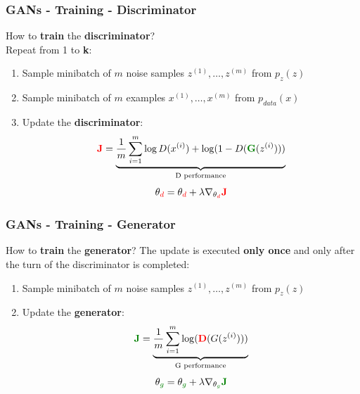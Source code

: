 \documentclass{beamer}
\begin{document}
\begin{frame}
\frametitle{GANs - Training - Discriminator}
How to \textbf{train} the \textbf{discriminator}? \\
Repeat from 1 to \textbf{k}:
\begin{enumerate}
\item<1-> \alert<+>{Sample minibatch of $m$ noise samples ${z^{(1)},\dots,z^{(m)}}$ from $p_z(z)$}
\item<2-> \alert<+>{Sample minibatch of $m$ examples ${x^{(1)},\dots,x^{(m)}}$ from $p_{data}(x)$}
\item<3-> \alert<+>{Update the \textbf{discriminator}:
\begin{equation*}
\textcolor{red}{\mathbf{J}} =  \underbrace{\frac{1}{m} \sum_{i=1}^{m} \log D(x^{(i)}) + \log(1 - D(\textcolor{real}{\mathbf{G}}(z^{(i)})))}_{\text{D performance}}
\end{equation*}
\LARGE		
\begin{equation*}
\theta_{\textcolor{red}{d}} = \theta_{\textcolor{red}{d}} + \lambda \nabla_{\theta_{\textcolor{red}{d}}} \textcolor{red}{\mathbf{J}}
\end{equation*}	
}
\end{enumerate}
\end{frame}

\begin{frame}
\frametitle{GANs - Training - Generator}
How to \textbf{train} the \textbf{generator}? \newline
The update is executed \textbf{only once} and only after the turn of the discriminator is completed:
\begin{enumerate}
\item<1-> \alert<+>{Sample minibatch of $m$ noise samples ${z^{(1)},\dots,z^{(m)}}$ from $p_z(z)$}
\item<2-> \alert<+>{Update the \textbf{generator}:
\begin{equation*}
\textcolor{real}{\mathbf{J}} = \underbrace{\frac{1}{m} \sum_{i=1}^{m} \log( \textcolor{red}{\mathbf{D}}(G(z^{(i)})))}_{\text{G performance}}
\end{equation*}
\LARGE
\begin{equation*}
\theta_{\textcolor{real}{g}} = \theta_{\textcolor{real}{g}}  + \lambda \nabla_{\theta_{\textcolor{real}{g}}} \textcolor{real}{\mathbf{J}}
\end{equation*}
}
\end{enumerate}
\end{frame} 
\end{document}
